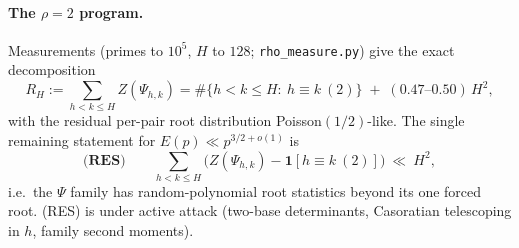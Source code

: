 \paragraph{The $\rho=2$ program.}  Measurements (primes to $10^5$, $H$ to
$128$; \texttt{rho\_measure.py}) give the exact decomposition
\[
R_H:=\sum_{h<k\le H}Z(\Psi_{h,k})
=\#\{h<k\le H:\ h\equiv k\ (2)\}\;+\;(0.47\text{--}0.50)\,H^2 ,
\]
with the residual per-pair root distribution Poisson$(1/2)$-like.  The single
remaining statement for $E(p)\ll p^{3/2+o(1)}$ is
\[
\textbf{(RES)}\qquad \sum_{h<k\le H}\bigl(Z(\Psi_{h,k})-\mathbf 1[h\equiv k\ (2)]\bigr)\ \ll\ H^2 ,
\]
i.e.\ the $\Psi$ family has random-polynomial root statistics beyond its one
forced root.  (RES) is under active attack (two-base determinants, Casoratian
telescoping in $h$, family second moments).
